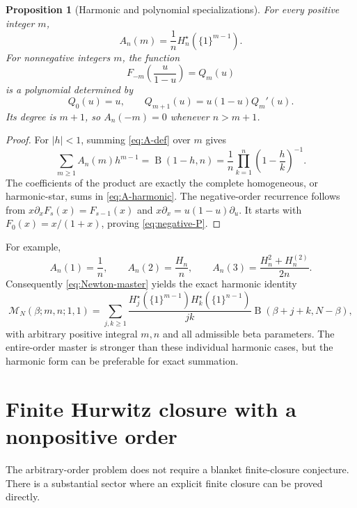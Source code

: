 \documentclass[11pt]{article}
\numberwithin{equation}{section}
\newtheorem{proposition}[theorem]{Proposition}
\theoremstyle{definition}
\DeclareMathOperator{\B}{B}
\newcommand{\MM}{\mathcal M}
\begin{document}
\begin{proposition}[Harmonic and polynomial specializations]\label{prop:A-special}
For every positive integer $m$,
\begin{equation}\label{eq:A-harmonic}
 A_n(m)=\frac1nH_n^\star(\{1\}^{m-1}).
\end{equation}
For nonnegative integers $m$, the function
\begin{equation}\label{eq:negative-P}
 F_{-m}\!\left(\frac{u}{1-u}\right)=Q_m(u)
\end{equation}
is a polynomial determined by
\begin{equation}\label{eq:negative-recurrence}
 Q_0(u)=u,\qquad Q_{m+1}(u)=u(1-u)Q_m'(u).
\end{equation}
Its degree is $m+1$, so $A_n(-m)=0$ whenever $n>m+1$.
\end{proposition}
\begin{proof}
For $|h|<1$, summing \eqref{eq:A-def} over $m$ gives
\[
 \sum_{m\ge1}A_n(m)h^{m-1}
 =\B(1-h,n)=\frac1n\prod_{k=1}^n\left(1-\frac hk\right)^{-1}.
\]
The coefficients of the product are exactly the complete homogeneous, or harmonic-star, sums in \eqref{eq:A-harmonic}. The negative-order recurrence follows from $x\partial_xF_s(x)=F_{s-1}(x)$ and $x\partial_x=u(1-u)\partial_u$. It starts with $F_0(x)=x/(1+x)$, proving \eqref{eq:negative-P}.
\end{proof}

For example,
\[
 A_n(1)=\frac1n,\qquad A_n(2)=\frac{H_n}{n},\qquad
 A_n(3)=\frac{H_n^2+H_n^{(2)}}{2n}.
\]
Consequently \eqref{eq:Newton-master} yields the exact harmonic identity
\begin{equation}\label{eq:harmonic-beta}
 \MM_N(\beta;m,n;1,1)=
 \sum_{j,k\ge1}\frac{H_j^\star(\{1\}^{m-1})H_k^\star(\{1\}^{n-1})}{jk}
 \B(\beta+j+k,N-\beta),
\end{equation}
with arbitrary positive integral $m,n$ and all admissible beta parameters. The entire-order master is stronger than these individual harmonic cases, but the harmonic form can be preferable for exact summation.

\section{Finite Hurwitz closure with a nonpositive order}\label{sec:negative}
The arbitrary-order problem does not require a blanket finite-closure conjecture. There is a substantial sector where an explicit finite closure can be proved directly.
\end{document}
